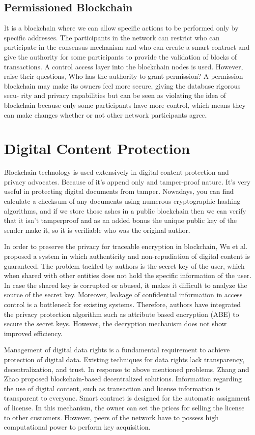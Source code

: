 \documentclass[BTech]{srmuthesis}
\begin{document}
 \subsection{Permissioned Blockchain}
 It is a blockchain where we can allow specific actions to be performed only by specific addresses. The participants in the network can restrict who can participate in the consensus mechanism and who can create a smart contract and give the authority for some participants to provide the validation of blocks of transactions. A control access layer into the blockchain nodes is used. However, raise their questions, Who has the authority to grant permission? A permission blockchain may make its owners feel more secure, giving the database rigorous secu- rity and privacy capabilities but can be seen as violating the idea of blockchain because only some participants have more control, which means they can make changes whether or not other network participants agree.

 \section{Digital Content Protection}
 Blockchain technology is used extensively in digital content protection and privacy advocates. Because of it's append only and tamper-proof nature. It's very useful in protecting digital documents from tamper. Nowadays, you can find calculate a checksum of any documents using numerous cryptographic hashing algorithms, and if we store those ashes in a public blockchain then we can verify that it isn't tamperproof and as an added bonus the unique public key of the sender make it, so it is verifiable who was the original author. 

 In order to preserve the privacy for traceable encryption in blockchain, Wu et al. proposed a system in which authenticity and non-repudiation of digital content is guaranteed. The problem tackled by authors is the secret key of the user, which when shared with other entities does not hold the specific information of the user. In case the shared key is corrupted or abused, it makes it difficult to analyze the source of the secret key. Moreover, leakage of confidential information in access control is a bottleneck for existing systems.
 Therefore, authors have integrated the privacy protection algorithm such as attribute based encryption (ABE) to secure the secret keys. However, the decryption mechanism does not show improved efficiency.

 Management of digital data rights is a fundamental requirement to achieve protection of digital data. Existing techniques for data rights lack transparency, decentralization, and trust. In response to above mentioned problems, Zhang and Zhao proposed blockchain-based decentralized solutions. Information regarding the use of digital content, such as transaction and license information is transparent to everyone. Smart contract is designed for the automatic assignment of license. In this mechanism, the owner can set the prices for selling the license to other customers. However, peers of the network have to possess high computational power to perform key acquisition.
\end{document}
